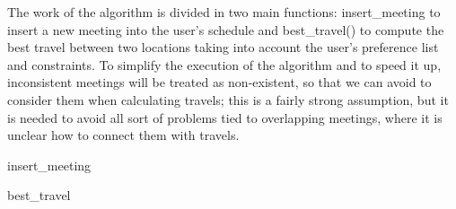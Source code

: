 
The work of the algorithm is divided in two main functions: insert_meeting to insert a new meeting into the user's schedule and best_travel() to compute the best travel between two locations taking into account the user's preference list and constraints. To simplify the execution of the algorithm and to speed it up, inconsistent meetings will be treated as non-existent, so that we can avoid to consider them when calculating travels; this is a fairly strong assumption, but it is needed to avoid all sort of problems tied to overlapping meetings, where it is unclear how to connect them with travels.

insert_meeting



best_travel

